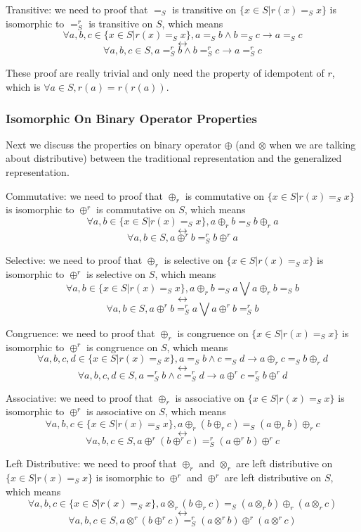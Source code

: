 \documentclass[a4paper,10pt]{article}
\begin{document}
Transitive: we need to proof that $=_S$ is transitive on $\{x \in S | r(x) =_S x \}$ is isomorphic to $=^r_S$ is transitive on $S$, which means 
\[\forall a,b,c \in \{x \in S | r(x) =_S x \}, a =_S b \wedge b =_S c \rightarrow a =_S c \]
\[\longleftrightarrow \]
\[\forall a,b,c \in S, a =^r_S b \wedge b =^r_S c \rightarrow a =^r_S c
\]

These proof are really trivial and only need the property of idempotent of $r$, which is $\forall a \in S, r(a) = r(r(a))$.

\subsubsection{Isomorphic On Binary Operator Properties}
Next we discuss the properties on binary operator $\oplus$ (and $\otimes$ when we are talking about distributive) between the traditional representation and the generalized representation.

Commutative: we need to proof that $\oplus_r$ is commutative on $\{x \in S | r(x) =_S x\}$ is isomorphic to $\oplus^r$ is commutative on $S$, which means 
\[\forall a,b \in \{x \in S | r(x) =_S x \}, a \oplus_r b =_S b \oplus_r a \]
\[\longleftrightarrow \]
\[\forall a,b \in S, a \oplus^r b =^r_S b \oplus^r a
\]

Selective:  we need to proof that $\oplus_r$ is selective on $\{x \in S | r(x) =_S x\}$ is isomorphic to $\oplus^r$ is selective on $S$, which means 
\[\forall a,b \in \{x \in S | r(x) =_S x\}, a \oplus_r b =_S a \bigvee a \oplus_r b =_S b \]
\[\longleftrightarrow \]
\[\forall a,b \in S, a \oplus^r b =^r_S a \bigvee a \oplus^r b =^r_S b
\]

Congruence: we need to proof that $\oplus_r$ is congruence on $\{x \in S | r(x) =_S x\}$ is isomorphic to $\oplus^r$ is congruence on $S$, which means 
\[\forall a,b,c,d \in \{x \in S | r(x) =_S x \}, a =_S b \wedge c =_S d \rightarrow a \oplus_r c =_S b \oplus_r d \]
\[\longleftrightarrow \]
\[\forall a,b,c,d \in S, a =^r_S b \wedge c =^r_S d \rightarrow a \oplus^r c =^r_S b \oplus^r d
\]

Associative: we need to proof that $\oplus_r$ is associative on $\{x \in S | r(x) =_S x\}$ is isomorphic to $\oplus^r$ is associative on $S$, which means 
\[\forall a,b,c \in \{x \in S | r(x) =_S x \}, a \oplus_r (b \oplus_r c) =_S (a \oplus_r b) \oplus_r c \]
\[\longleftrightarrow \]
\[\forall a,b,c \in S, a \oplus^r (b \oplus^r c) =^r_S (a \oplus^r b) \oplus^r c
\]

Left Distributive: we need to proof that $\oplus_r$ and $\otimes_r$ are left distributive on $\{x \in S | r(x) =_S x\}$ is isomorphic to $\oplus^r$ and $\oplus^r$ are left distributive on $S$, which means 
\[\forall a,b,c \in \{x \in S | r(x) =_S x \}, a \otimes_r (b \oplus_r c) =_S (a \otimes_r b) \oplus_r (a \otimes_r c) \]
\[\longleftrightarrow \]
\[\forall a,b,c \in S, a \otimes^r (b \oplus^r c) =^r_S (a \otimes^r b) \oplus^r (a \otimes^r c)
\]
\end{document}
